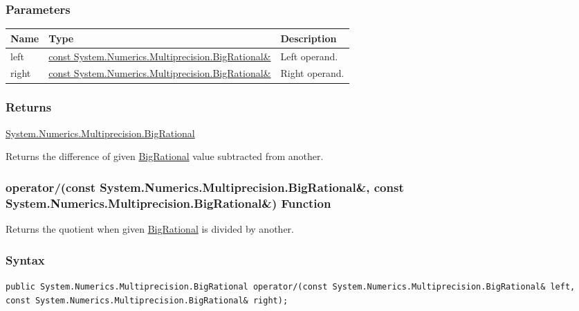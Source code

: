\documentclass[a4paper,oneside,11.000000pt]{book}
\begin{document}
\subsubsection*{Parameters}
\begin{flushleft}
\begin{supertabular}[l]{!{\raggedright}p{1.30721cm}!{\raggedright}p{8.55945cm}!{\raggedright}p{3.66839cm}}
\textbf{Name}
& \textbf{Type}
& \textbf{Description}
\\
\hline
left
& \hyperlink{System.Numerics.Multiprecision.BigRational}{const System.\-Numerics.\-Multiprecision.\-BigRational\&\-}
& Left operand.

\\
right
& \hyperlink{System.Numerics.Multiprecision.BigRational}{const System.\-Numerics.\-Multiprecision.\-BigRational\&\-}
& Right operand.

\\
\end{supertabular}

\end{flushleft}
\subsubsection*{Returns}
\hyperlink{System.Numerics.Multiprecision.BigRational}{System.\-Numerics.\-Multiprecision.\-BigRational}
\begin{flushleft}
Returns the difference of given \hyperlink{System.Numerics.Multiprecision.BigRational}{BigRational} value subtracted from another.

\end{flushleft}
\clearpage

\hypertarget{System.Numerics.Multiprecision.operator.divides.C.R.System.Numerics.Multiprecision.BigRational.C.R.System.Numerics.Multiprecision.BigRational}{\subsubsection*{operator/(const System.Numerics.Multiprecision.BigRational\&, const System.Numerics.Multiprecision.BigRational\&) Function}}
\begin{flushleft}
Returns the quotient when given \hyperlink{System.Numerics.Multiprecision.BigRational}{BigRational} is divided by another.

\end{flushleft}
\subsubsection*{Syntax}
\texttt{public System.Numerics.Multiprecision.BigRational operator/(const System.Numerics.Multiprecision.BigRational\& left, const System.Numerics.Multiprecision.BigRational\& right);}
\end{document}
